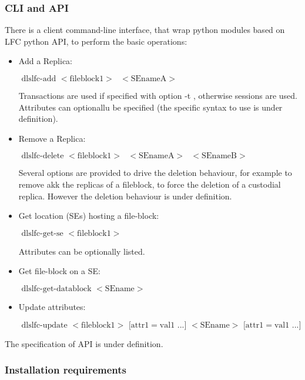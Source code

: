 \documentclass[pdftex]{cmspaper}
\begin{document}
\subsubsection{ CLI and API}
 There is a client command-line interface, that wrap python modules based on LFC python API, to perform the basic operations: 
 \begin{itemize}
   \item Add a Replica: 
\begin{flushleft}
  $\mbox{ dlslfc-add $<$fileblock1$>$  $<$SEnameA$>$ }$
\end{flushleft}
 
   Transactions are used if specified with option -t , otherwise sessions are used. Attributes can optionallu be specified (the specific syntax to use is under definition).

   \item Remove a Replica:
\begin{flushleft}
 $\mbox{ dlslfc-delete $<$fileblock1$>$ $<$SEnameA$>$ $<$SEnameB$>$ }$
\end{flushleft}

 Several options are provided to drive the deletion behaviour, for example
 to remove akk the replicas of a fileblock, to force the deletion of a custodial replica. However the deletion behaviour is under definition.

  \item Get location (SEs) hosting a file-block:
\begin{flushleft}
$\mbox{ dlslfc-get-se $<$fileblock1$>$ }$
\end{flushleft}

 Attributes can be optionally listed.

  \item Get file-block on a SE:
\begin{flushleft}
$\mbox{ dlslfc-get-datablock $<$SEname$>$}$
\end{flushleft}

  \item Update attributes:
\begin{flushleft}
$\mbox{ dlslfc-update  $<$fileblock1$>$ [attr1$=$val1 ...] $<$SEname$>$ [attr1$=$val1 ...]}$
\end{flushleft}
   \end{itemize}

The specification of API is under definition.

\subsubsection{ Installation requirements }
\end{document}
